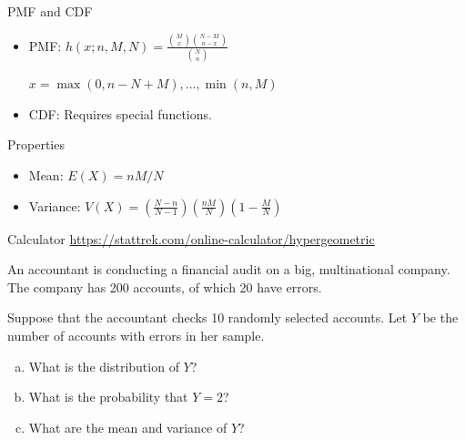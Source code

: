 \begin{frame}
  \begin{block}{PMF and CDF}
    \begin{itemize}
    \item PMF: $h(x;n,M,N)=\frac{\binom{M}{x}{\binom{N-M}{n-x}}}
      {\binom{N}{n}}$

      \hspace{1in} $x=\max(0,n-N+M),\ldots,\min(n,M)$
      
    \item CDF: Requires special functions.
    \end{itemize}
  \end{block}


  \begin{block}{Properties}
    \begin{itemize}
    \item Mean: $E(X)=nM/N$

    \item Variance: $V(X)=\left(\frac{N-n}{N-1}\right)\left(\frac{nM}{N}\right)\left(1-\frac{M}{N}\right)$
      
    \end{itemize}
  \end{block}
  
  \begin{block}{Calculator}
  \url{https://stattrek.com/online-calculator/hypergeometric}
  \end{block}
\end{frame}

\begin{frame}

  \begin{block}{\example}

    An accountant is conducting a financial audit on a big, multinational company. The company has 200 accounts, of which 20 have errors. 

    \bigskip
    Suppose that the accountant checks 10 randomly selected accounts. Let $Y$ be the number of accounts with errors in her sample.
    \begin{enumerate}[a)]
    \item What is the distribution of $Y$?
    \item What is the probability that $Y=2$?
    \item What are the mean and variance of $Y$?
    \end{enumerate}
  \end{block}
\end{frame}

